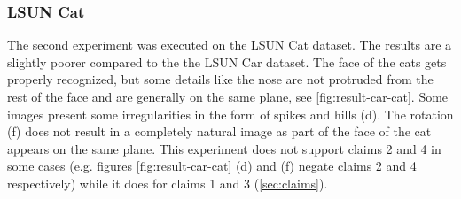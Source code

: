 \subsubsection{LSUN Cat}
The second experiment was executed on the LSUN Cat dataset. The results are a slightly poorer compared to the the LSUN Car dataset. The face of the cats gets properly recognized, but some details like the nose are not protruded from the rest of the face and are generally on the same plane, see \autoref{fig:result-car-cat}. Some images present some irregularities in the form of spikes and hills (d). The rotation (f) does not result in a completely natural image as part of the face of the cat appears on the same plane. This experiment does not support claims 2 and 4 in some cases (e.g. figures \ref{fig:result-car-cat} (d) and (f) negate claims 2 and 4 respectively) while it does for claims 1 and 3 (\autoref{sec:claims}).

